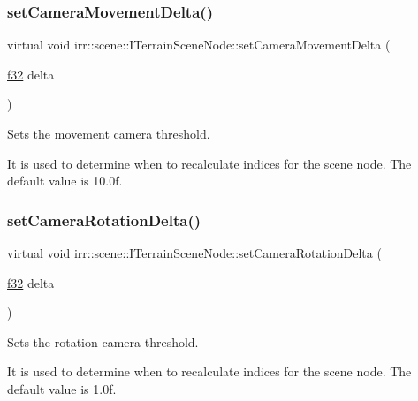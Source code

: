 \subsubsection{\texorpdfstring{set\+Camera\+Movement\+Delta()}{setCameraMovementDelta()}\hspace{0.1cm}{\footnotesize\ttfamily [2/2]}}
{\footnotesize\ttfamily virtual void irr\+::scene\+::\+I\+Terrain\+Scene\+Node\+::set\+Camera\+Movement\+Delta (\begin{DoxyParamCaption}\item[{\hyperlink{namespaceirr_a0277be98d67dc26ff93b1a6a1d086b07}{f32}}]{delta }\end{DoxyParamCaption})\hspace{0.3cm}{\ttfamily [pure virtual]}}



Sets the movement camera threshold. 

It is used to determine when to recalculate indices for the scene node. The default value is 10.\+0f. \mbox{\label{classirr_1_1scene_1_1ITerrainSceneNode_ad11f3e54c291487c49868728a5228b5e}} 
\subsubsection{\texorpdfstring{set\+Camera\+Rotation\+Delta()}{setCameraRotationDelta()}\hspace{0.1cm}{\footnotesize\ttfamily [1/2]}}
{\footnotesize\ttfamily virtual void irr\+::scene\+::\+I\+Terrain\+Scene\+Node\+::set\+Camera\+Rotation\+Delta (\begin{DoxyParamCaption}\item[{\hyperlink{namespaceirr_a0277be98d67dc26ff93b1a6a1d086b07}{f32}}]{delta }\end{DoxyParamCaption})\hspace{0.3cm}{\ttfamily [pure virtual]}}



Sets the rotation camera threshold. 

It is used to determine when to recalculate indices for the scene node. The default value is 1.\+0f. \mbox{\label{classirr_1_1scene_1_1ITerrainSceneNode_ad11f3e54c291487c49868728a5228b5e}} 
